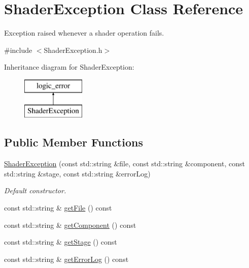 \hypertarget{class_shader_exception}{}\section{Shader\+Exception Class Reference}
\label{class_shader_exception}


Exception raised whenever a shader operation fails.  




{\ttfamily \#include $<$Shader\+Exception.\+h$>$}

Inheritance diagram for Shader\+Exception\+:\begin{figure}[H]
\begin{center}
\leavevmode
\includegraphics[height=2.000000cm]{class_shader_exception}
\end{center}
\end{figure}
\subsection*{Public Member Functions}
\begin{DoxyCompactItemize}
\item 
\hyperlink{class_shader_exception_a049037e52e22d2a229def811ca6713fd}{Shader\+Exception} (const std\+::string \&file, const std\+::string \&component, const std\+::string \&stage, const std\+::string \&error\+Log)
\begin{DoxyCompactList}\small\item\em Default constructor. \end{DoxyCompactList}\item 
const std\+::string \& \hyperlink{class_shader_exception_a1e3806a87d7707f9da52095d8f4de530}{get\+File} () const 
\item 
const std\+::string \& \hyperlink{class_shader_exception_a634ea552b39aa510aef3436df9c5c95d}{get\+Component} () const 
\item 
const std\+::string \& \hyperlink{class_shader_exception_a855c9f2b9363c2ce6f2439b4b44a2380}{get\+Stage} () const 
\item 
const std\+::string \& \hyperlink{class_shader_exception_a34911ad17ca116d95d41c45f4faccc7c}{get\+Error\+Log} () const 
\end{DoxyCompactItemize}
